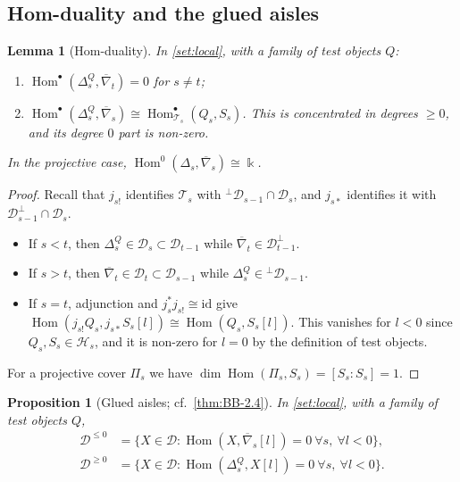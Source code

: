 \documentclass[11pt,reqno]{amsart}
\theoremstyle{plain}
\newtheorem{proposition}[theorem]{Proposition}
\newtheorem{lemma}[theorem]{Lemma}
\theoremstyle{definition}
\theoremstyle{remark}
\newcommand{\kk}{\Bbbk}
\DeclareMathOperator{\Hom}{Hom}
\newcommand{\nablabar}{\overline{\nabla}}
\newcommand{\cD}{\mathcal{D}}
\newcommand{\cH}{\mathcal{H}}
\newcommand{\cT}{\mathcal{T}}
\begin{document}
\subsection{Hom-duality and the glued aisles}

\begin{lemma}[Hom-duality]\label{lem:hom-duality}
In \cref{set:local}, with a family of test objects $Q$:
\begin{enumerate}
\item $\Hom^\bullet(\Delta^Q_s,\nablabar_t)=0$ for $s\ne t$;
\item $\Hom^\bullet(\Delta^Q_s,\nablabar_s)\cong\Hom^\bullet_{\cT_s}(Q_s,S_s)$. This is concentrated in degrees $\ge0$, and its degree $0$ part is non-zero.
\end{enumerate}
In the projective case, $\Hom^0(\Delta_s,\nablabar_s)\cong\kk$.
\end{lemma}

\begin{proof}
Recall that $j_{s!}$ identifies $\cT_s$ with ${}^\perp\cD_{s-1}\cap\cD_s$, and $j_{s*}$ identifies it with $\cD_{s-1}^\perp\cap\cD_s$.
\begin{itemize}
\item If $s<t$, then $\Delta^Q_s\in\cD_s\subset\cD_{t-1}$ while $\nablabar_t\in\cD_{t-1}^\perp$.
\item If $s>t$, then $\nablabar_t\in\cD_t\subset\cD_{s-1}$ while $\Delta^Q_s\in{}^\perp\cD_{s-1}$.
\item If $s=t$, adjunction and $j_s^*j_{s!}\cong\mathrm{id}$ give $\Hom(j_{s!}Q_s,j_{s*}S_s[l])\cong\Hom(Q_s,S_s[l])$. This vanishes for $l<0$ since $Q_s,S_s\in\cH_s$, and it is non-zero for $l=0$ by the definition of test objects.
\end{itemize}
For a projective cover $\Pi_s$ we have $\dim\Hom(\Pi_s,S_s)=[S_s:S_s]=1$.
\end{proof}

\begin{proposition}[Glued aisles; cf.\ {\cref{thm:BB-2.4}}]\label{prop:aisles}
In \cref{set:local}, with a family of test objects $Q$,
\begin{align*}
\cD^{\le0}&=\{X\in\cD:\Hom(X,\nablabar_s[l])=0\ \forall s,\ \forall l<0\},\\
\cD^{\ge0}&=\{X\in\cD:\Hom(\Delta^Q_s,X[l])=0\ \forall s,\ \forall l<0\}.
\end{align*}
\end{proposition}
\end{document}

